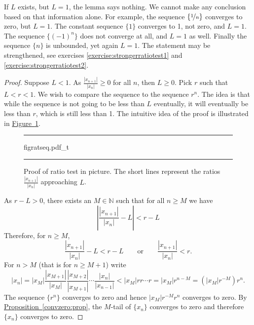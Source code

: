 \documentclass[12pt]{book}
\newenvironment{myfigureht}{%
\begin{figure}[h!t]
\noindent\rule{\textwidth}{0.4pt}\vspace{12pt}\par\centering}%
{\par\noindent\rule{\textwidth}{0.4pt}
\end{figure}}
\newcommand{\abs}[1]{\left\lvert {#1} \right\rvert}
\newcommand{\N}{{\mathbb{N}}}
\theoremstyle{plain}
\theoremstyle{remark}
\theoremstyle{definition}
\theoremstyle{exercise}
\theoremstyle{example}
\newcommand{\figureref}[1]{\hyperref[#1]{Figure~\ref*{#1}}}
\newcommand{\propref}[1]{\hyperref[#1]{Proposition~\ref*{#1}}}
\begin{document}
If $L$ exists, but $L=1$, the lemma says nothing.  We cannot make any
conclusion based on that information alone.  For example,
the sequence $\{ \nicefrac{1}{n} \}$ converges to zero, but $L=1$.
The constant sequence $\{ 1 \}$ converges to 1, not zero, and 
$L=1$.  The sequence $\{ {(-1)}^n \}$ does not converge at all, and $L=1$ as
well.
Finally the sequence $\{  n \}$ is unbounded, yet again $L=1$.
The statement may be strengthened, see 
exercises \ref{exercise:strongerratiotest1} and
\ref{exercise:strongerratiotest2}.

\begin{proof}
Suppose $L < 1$.
As
$\frac{\abs{x_{n+1}}}{\abs{x_n}} \geq 0$ for all $n$, then $L \geq 0$.  Pick
$r$ such that $L < r < 1$.
We wish to compare the sequence to the sequence $r^n$.  The idea is that
while the sequence is not going to be less than $L$ eventually,
it will eventually be less than $r$, which is still less than 1.
The intuitive idea of the proof is illustrated in \figureref{figratseq}.
\begin{myfigureht}
{figratseq.pdf_t}
\caption{Proof of ratio test in picture.  The short lines represent the
ratios 
$\frac{\abs{x_{n+1}}}{\abs{x_n}}$
approaching $L$.\label{figratseq}}
\end{myfigureht}

As $r-L > 0$, there exists an $M \in \N$ such that for
all $n \geq M$ we have
\begin{equation*}
\abs{\frac{\abs{x_{n+1}}}{\abs{x_n}} - L} < r-L 
\end{equation*}
Therefore, for $n \geq M$,
\begin{equation*}
\frac{\abs{x_{n+1}}}{\abs{x_n}} - L < r-L 
\qquad \text{or} \qquad
\frac{\abs{x_{n+1}}}{\abs{x_n}} < r .
\end{equation*}
For $n > M$ (that is for $n \geq M+1$)
write
\begin{equation*}
\abs{x_n} =
\abs{x_M}
\frac{\abs{x_{M+1}}}{\abs{x_{M}}}
\frac{\abs{x_{M+2}}}{\abs{x_{M+1}}}
\cdots
\frac{\abs{x_{n}}}{\abs{x_{n-1}}}
<
\abs{x_M}
r r \cdots r = \abs{x_M} r^{n-M} = (\abs{x_M} r^{-M}) r^n .
\end{equation*}
The sequence $\{ r^n \}$ converges to zero and hence 
$\abs{x_M} r^{-M} r^n$ converges to zero.  By \propref{convzero:prop},
the $M$-tail of 
$\{x_n\}$ converges to zero and therefore $\{x_n\}$ converges to zero.


\end{proof}
\end{document}

